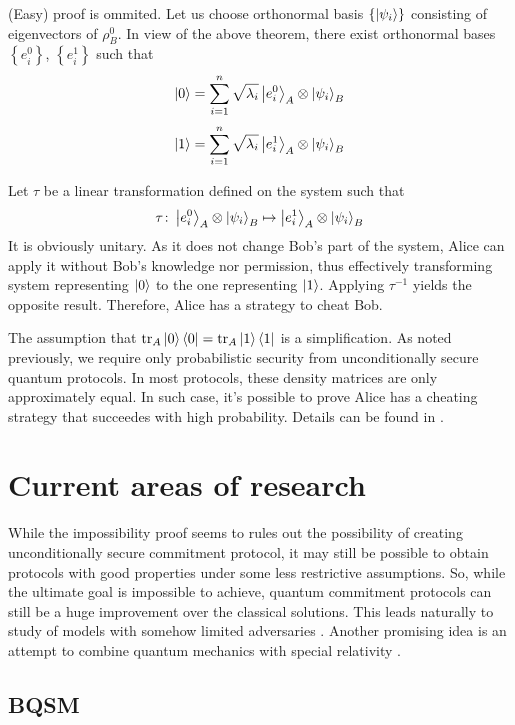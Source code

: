 \documentclass[10pt]{article}
\begin{document}
\vspace{3mm}

(Easy) proof is ommited. Let us choose orthonormal basis \(\left\{\Ket{\psi_i}\right\}\)
consisting of eigenvectors of \(\rho_B^0\). In view of the above theorem, there exist orthonormal
bases \(\left\{e_i^0\right\}\), \(\left\{e_i^1\right\}\) such that
\[
\Ket{0}=\sum_{i=1}^n\sqrt{\lambda_i}\Ket{e_i^0}_A\otimes\Ket{\psi_i}_B
\]
\[
\Ket{1}=\sum_{i=1}^n\sqrt{\lambda_i}\Ket{e_i^1}_A\otimes\Ket{\psi_i}_B
\]

Let \(\tau\) be a linear transformation defined on the system such that 
\[
\tau\colon\Ket{e_i^0}_A\otimes\Ket{\psi_i}_B \mapsto\Ket{e_i^1}_A\otimes\Ket{\psi_i}_B
\]
It is obviously unitary. As it does not change Bob's part of the system, Alice can apply it 
without Bob's knowledge nor permission, thus effectively transforming system representing \(\Ket{0}\)
to the one representing \(\Ket{1}\). Applying \(\tau^{-1}\) yields the opposite result. Therefore, 
Alice has a strategy to cheat Bob.

The assumption that \(\operatorname{tr}_A \Ket{0}\Bra{0} = \operatorname{tr}_A \Ket{1}\Bra{1}\)
is a simplification. As noted previously, we require only probabilistic security from unconditionally
secure quantum protocols. In most protocols, these density matrices are only approximately equal.
In such case, it's possible to prove Alice has a cheating strategy that succeedes with high 
probability. Details can be found in \cite{Lo96}.

\section{Current areas of research}

While the impossibility proof seems to rules out the possibility of creating unconditionally secure
commitment protocol, it may still be possible to obtain protocols with good properties under some
less restrictive assumptions. So, while the ultimate goal is impossible to achieve, quantum commitment
protocols can still be a huge improvement over the classical solutions. This leads naturally to study
of models with somehow limited adversaries \cite{Damgard05,Wehner08}. Another promising idea is an
attempt to combine quantum mechanics with special relativity \cite{Kent12}.

\subsection{BQSM}
\end{document}
